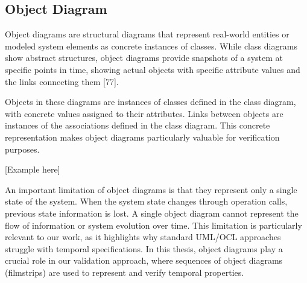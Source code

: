 \subsection{Object Diagram}
Object diagrams are structural diagrams that represent real-world entities or 
modeled system elements as concrete instances of classes. While class diagrams 
show abstract structures, object diagrams provide snapshots of a system at specific 
points in time, showing actual objects with specific attribute values and the links 
connecting them [77].

Objects in these diagrams are instances of classes defined in the class diagram, 
with concrete values assigned to their attributes. Links between objects are 
instances of the associations defined in the class diagram. This concrete 
representation makes object diagrams particularly valuable for verification purposes.

[Example here]

An important limitation of object diagrams is that they represent only a single 
state of the system. When the system state changes through operation calls, 
previous state information is lost. A single object diagram cannot represent 
the flow of information or system evolution over time. This limitation is 
particularly relevant to our work, as it highlights why standard UML/OCL approaches 
struggle with temporal specifications. In this thesis, object diagrams play a crucial 
role in our validation approach, where sequences of object diagrams (filmstrips) 
are used to represent and verify temporal properties.


